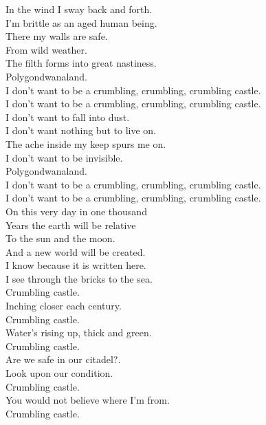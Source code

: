 In the wind I sway back and forth. \\
I'm brittle as an aged human being. \\
There my walls are safe. \\
From wild weather. \\
The filth forms into great nastiness. \\
Polygondwanaland. \\

I don't want to be a crumbling, crumbling, crumbling castle. \\
I don't want to be a crumbling, crumbling, crumbling castle. \\

I don't want to fall into dust. \\
I don't want nothing but to live on. \\
The ache inside my keep spurs me on. \\
I don't want to be invisible. \\
Polygondwanaland. \\

I don't want to be a crumbling, crumbling, crumbling castle. \\
I don't want to be a crumbling, crumbling, crumbling castle. \\

On this very day in one thousand \\
Years the earth will be relative \\
To the sun and the moon. \\
And a new world will be created. \\
I know because it is written here. \\

I see through the bricks to the sea. \\
Crumbling castle. \\
Inching closer each century. \\
Crumbling castle. \\
Water's rising up, thick and green. \\
Crumbling castle. \\
Are we safe in our citadel?. \\

Look upon our condition. \\
Crumbling castle. \\
You would not believe where I'm from. \\
Crumbling castle. \\

